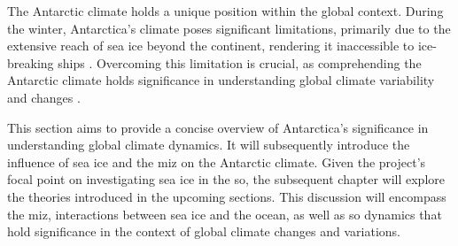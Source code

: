 
The Antarctic climate holds a unique position within the global context. During the winter, Antarctica's climate poses significant limitations, primarily due to the extensive reach of sea ice beyond the continent, rendering it inaccessible to ice-breaking ships \cite{Maksym2012}. Overcoming this limitation is crucial, as comprehending the Antarctic climate holds significance in understanding global climate variability and changes \cite{Kennicut2019}.

This section aims to provide a concise overview of Antarctica's significance in understanding global climate dynamics. It will subsequently introduce the influence of sea ice and the \ac{miz} on the Antarctic climate. Given the project's focal point on investigating sea ice in the \acs{so}, the subsequent chapter will explore the theories introduced in the upcoming sections. This discussion will encompass the \acs{miz}, interactions between sea ice and the ocean, as well as \acs{so} dynamics that hold significance in the context of global climate changes and variations.


